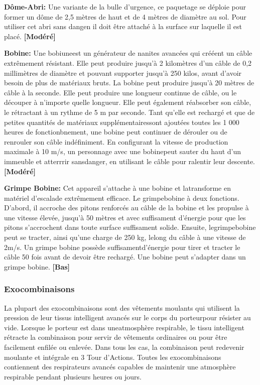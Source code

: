 \textbf{Dôme-Abri:} Une variante de la bulle d'urgence, ce paquetage se déploie pour former un dôme de 2,5 mètres de haut et de 4 mètres de diamètre au sol. Pour utiliser cet abri sans dangen il doit être attaché à la surface sur laquelle il est placé. \textbf{[Modéré]} 

\textbf{Bobine:} Une bobiuneest un générateur de nanites avancées qui crééent un câble extrêmement résistant. Elle peut produire jusqu'à 2 kilomètres d'un câble de 0,2 millimètres de diamètre et pouvant supporter jusqu'à 250 kilos, avant d'avoir besoin de plus de matériaux bruts. La bobine peut produire jusqu'à 20 mètres de câble à la seconde. Elle peut produire une longueur continue de câble, ou le découper à n'importe quelle longueur. Elle peut également réabsorber son câble, le rétractant à un rythme de 5 m par seconde. Tant qu'elle est rechargé et que de petites quantités de matériaux supplémentairessont ajoutées toutes les 1 000 heures de fonctionbnement, une bobine peut continuer de dérouler ou de renrouler son câble indéfiniment. En configurant la vitesse de production maximale à 10 m/s, un personnage avec une bobinepeut sauter du haut d'un immeuble et atterrrir sansdanger, en utilisant le câble pour ralentir leur descente. \textbf{[Modéré]} 

\textbf{Grimpe Bobine:} Cet appareil s'attache à une bobine et latransforme en matériel d'escalade extrêmement efficace. Le grimpebobine à deux fonctions. D'abord, il accroche des pitons renforcés au câble de la bobine et les propulse à une vitesse élevée, jusqu'à 50 mètres et avec suffisament d'énergie pour que les pitons s'accrochent dans toute surface suffisament solide. Ensuite, legrimpebobine peut se tracter, ainsi qu'une charge de 250 kg, lelong du câble à une vitesse de 2m/s. Un grimpe bobine possède suffisamentd'énergie pour tirer et tracter le câble 50 fois avant de devoir être rechargé. Une bobine peut s'adapter dans un grimpe bobine. \textbf{[Bas]} 

\subsubsection{Exocombinaisons} 

La plupart des exocombinaisons sont des vêtements moulants qui utilisent la pression de leur tissus intelligent avancés sur le corps du porteurpour résister au vide. Lorsque le porteur est dans uneatmosphère respirable, le tissu intelligent rétracte la combinaison pour servir de vêtements ordinaires ou pour être facilement enfilée ou enlevée. Dans tous les cas, la combinaison peut redevenir moulante et intégrale en 3 Tour d'Actions. Toutes les exocombinaisons contiennent des respirateurs avancés capables de maintenir une atmosphère respirable pendant plusieurs heures ou jours. 

